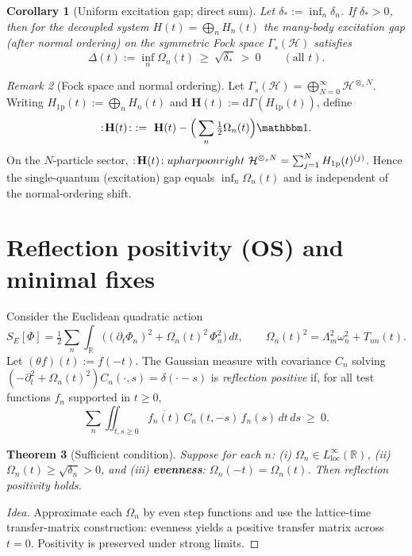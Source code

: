 \documentclass[11pt]{article}
\theoremstyle{plain}
\newtheorem{theorem}{Theorem}[section]
\newtheorem{corollary}[theorem]{Corollary}
\theoremstyle{definition}
\theoremstyle{remark}
\newtheorem{remark}[theorem]{Remark}
\newcommand{\R}{\mathbb{R}}
\newcommand{\Hcal}{\mathcal{H}}
\begin{document}
\begin{corollary}[Uniform excitation gap; direct sum]\label{cor:gap}
Let $\delta_*:=\inf_n\delta_n$. If $\delta_*>0$, then for the decoupled system $H(t)=\bigoplus_n H_n(t)$ the many-body \emph{excitation} gap (after normal ordering) on the symmetric Fock space $\Gamma_s(\Hcal)$ satisfies
\[
\Delta(t):=\inf_{n}\Omega_n(t)\ \ge\ \sqrt{\delta_*}\ >\ 0\qquad(\text{all }t).
\]
\end{corollary}
\begin{remark}[Fock space and normal ordering]
Let $\Gamma_s(\Hcal)=\bigoplus_{N=0}^{\infty}\Hcal^{\otimes_s N}$. Writing $H_{1\mathrm p}(t):=\bigoplus_n H_n(t)$ and $\mathbf H(t):=\mathrm d\Gamma(H_{1\mathrm p}(t))$, define
\[
:\!\mathbf H(t)\!:\ :=\ \mathbf H(t)-\Big(\sum_n\tfrac12\Omega_n(t)\Big)\mathbbm 1.
\]
On the $N$-particle sector, $:\!\mathbf H(t)\!:\\upharpoonright\ \Hcal^{\otimes_s N}=\sum_{j=1}^N H_{1\mathrm p}(t)^{(j)}$. Hence the single-quantum (excitation) gap equals $\inf_n\Omega_n(t)$ and is independent of the normal-ordering shift.
\end{remark}

\section{Reflection positivity (OS) and minimal fixes}\label{sec:OS}
Consider the Euclidean quadratic action
\[
S_E[\Phi]=\tfrac12\sum_{n}\int_{\R}\big((\partial_t\Phi_n)^2+\Omega_n(t)^2\,\Phi_n^2\big)\,dt,\qquad \Omega_n(t)^2=\Lambda_m^2\omega_n^2+T_{nn}(t).
\]
Let $(\theta f)(t):=f(-t)$. The Gaussian measure with covariance $C_n$ solving $(-\partial_t^2+\Omega_n(t)^2)C_n(\cdot,s)=\delta(\cdot-s)$ is \emph{reflection positive} if, for all test functions $f_n$ supported in $t\ge0$,
\[
\sum_n\iint_{t,s\ge0}\overline{f_n(t)}\,C_n(t,-s)\,f_n(s)\,dt\,ds\ \ge\ 0.
\]

\begin{theorem}[Sufficient condition]\label{thm:OS}
Suppose for each $n$: (i) $\Omega_n\in L^\infty_{\mathrm{loc}}(\R)$, (ii) $\Omega_n(t)\ge \sqrt{\delta_n}>0$, and (iii) \textbf{evenness}: $\Omega_n(-t)=\Omega_n(t)$. Then reflection positivity holds.
\end{theorem}
\begin{proof}[Idea]
Approximate each $\Omega_n$ by even step functions and use the lattice-time transfer-matrix construction: evenness yields a positive transfer matrix across $t=0$. Positivity is preserved under strong limits.
\end{proof}
\end{document}
